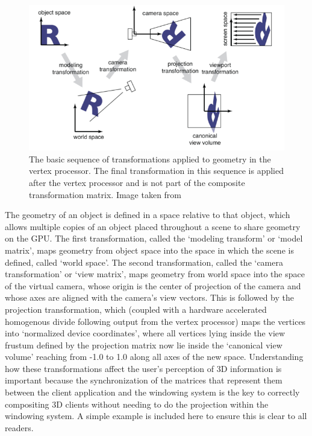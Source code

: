 \begin{figure}[ht!]
\centering
\includegraphics[width=1.0\textwidth]{images/vertex-transformation.png}
\caption{The basic sequence of transformations applied to geometry in the vertex processor. The final transformation in this sequence is applied after the vertex processor and is not part of the composite transformation matrix. Image taken from  \protect\cite{transform-image-ref}}
\label{fig:vertex-transformation}
\end{figure}


The geometry of an object is defined in a space relative to that object, which allows multiple copies of an object placed throughout a scene to share geometry on the GPU. The first transformation, called the ‘modeling transform’ or ‘model matrix’, maps geometry from object space into the space in which the scene is defined, called ‘world space’. The second transformation, called the ‘camera transformation’  or ‘view matrix’, maps geometry from world space into the space of the virtual camera, whose origin is the center of projection of the camera and whose axes are aligned with the camera’s view vectors. This is followed by the projection transformation, which (coupled with a hardware accelerated homogenous divide following output from the vertex processor) maps the vertices into ‘normalized device coordinates’, where all vertices lying inside the view frustum defined by the projection matrix now lie inside the ‘canonical view volume’ reaching from -1.0 to 1.0 along all axes of the new space.
Understanding how these transformations affect the user’s perception of 3D information is important because the synchronization of the matrices that represent them between the client application and the windowing system is the key to correctly compositing 3D clients without needing to do the projection within the windowing system. A simple example is included here to ensure this is clear to all readers.

